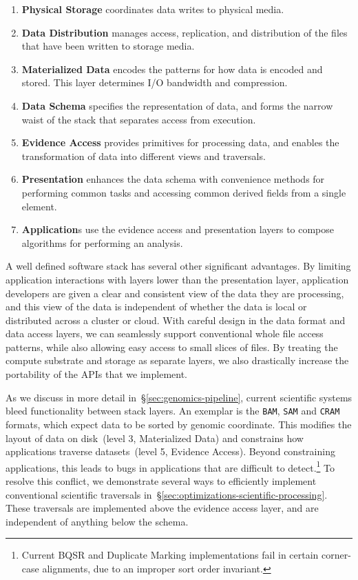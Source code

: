 \documentclass{acm_proc_article-sp}
\begin{document}
\begin{enumerate}
\item {\bf Physical Storage} coordinates data writes to physical media.
\item {\bf Data Distribution} manages access, replication, and distribution of the files that have
been written to storage media.
\item {\bf Materialized Data} encodes the patterns for how data is encoded and stored. This
layer determines I/O bandwidth and compression.
\item {\bf Data Schema} specifies the representation of data, and forms the narrow waist of
the stack that separates access from execution.
\item {\bf Evidence Access} provides primitives for processing data, and enables the transformation of
data into different views and traversals.
\item {\bf Presentation} enhances the data schema with convenience methods for performing
common tasks and accessing common derived fields from a single element.
\item {\bf Application}s use the evidence access and presentation layers to compose
algorithms for performing an analysis.
\end{enumerate}

A well defined software stack has several other significant advantages. By limiting application
interactions with layers lower than the presentation layer, application developers are given a clear and
consistent view of the data they are processing, and this view of the data is independent of whether the
data is local or distributed across a cluster or cloud. With careful design in the data format and data access layers,
we can seamlessly
support conventional whole file access patterns, while also allowing easy access to small slices of files.
By treating the compute substrate and storage as separate layers, we also drastically increase
the portability of the APIs that we implement.

As we discuss in more detail in~\S\ref{sec:genomics-pipeline}, current scientific systems bleed functionality between
stack layers. An exemplar is the \texttt{BAM}, \texttt{SAM} and \texttt{CRAM} formats, which expect data
to be sorted by genomic coordinate. This modifies the layout of data on disk~(level 3, Materialized Data)
and constrains how applications traverse datasets~(level 5, Evidence Access). Beyond
constraining applications, this leads to bugs in applications that are difficult to detect.\footnote{Current BQSR and
Duplicate Marking implementations fail in certain corner-case alignments, due to an improper sort order invariant.}
To resolve this conflict, we demonstrate several ways to efficiently implement conventional scientific
traversals in~\S\ref{sec:optimizations-scientific-processing}. These traversals are implemented above the
evidence access layer, and are independent of anything below the schema.
\end{document}
